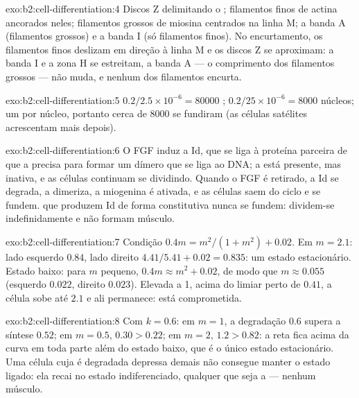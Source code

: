 \begin{solution}{exo:b2:cell-differentiation:4}
Discos Z delimitando o ; filamentos finos de actina ancorados
neles; filamentos grossos de miosina centrados na linha M; a banda A
(filamentos grossos) e a banda I (só filamentos finos). No
encurtamento, os filamentos finos deslizam em direção à linha M e os
discos Z se aproximam: a banda I e a zona H se estreitam, a banda A ---
o comprimento dos filamentos grossos --- não muda, e nenhum dos
filamentos encurta.
\end{solution}

\begin{solution}{exo:b2:cell-differentiation:5}
$0.2/2.5\times 10^{-6} = \num{80000}$ ; $0.2/25\times 10^{-6}
= \num{8000}$ núcleos; um  por núcleo, portanto cerca de
\num{8000}  se fundiram (as células satélites acrescentam
mais depois).
\end{solution}

\begin{solution}{exo:b2:cell-differentiation:6}
O FGF induz a Id, que se liga à proteína parceira de que a  precisa
para formar um dímero que se liga ao DNA; a  está presente, mas
inativa, e as células continuam se dividindo. Quando o FGF é retirado,
a Id se degrada, a  dimeriza, a miogenina é ativada, e as células
saem do ciclo e se fundem.  que produzem Id de forma
constitutiva nunca se fundem: dividem-se indefinidamente e não formam
músculo.
\end{solution}

\begin{solution}{exo:b2:cell-differentiation:7}
Condição $0.4m = m^{2}/(1 + m^{2}) + 0.02$. Em $m = 2.1$: lado esquerdo
$0.84$, lado direito $4.41/5.41 + 0.02 = 0.835$: um estado
estacionário. Estado baixo: para $m$ pequeno, $0.4m \approx m^{2} + 0.02$,
de modo que $m \approx
0.055$ (esquerdo $0.022$, direito $0.023$). Elevada a 1, acima do
limiar perto de $0.41$, a célula sobe até $2.1$ e ali permanece: está
comprometida.
\end{solution}

\begin{solution}{exo:b2:cell-differentiation:8}
Com $k = 0.6$: em $m = 1$, a degradação $0.6$ supera a síntese
$0.52$; em $m = 0.5$, $0.30 > 0.22$; em $m = 2$, $1.2 > 0.82$: a reta
fica acima da curva em toda parte além do estado baixo, que é o único
estado estacionário. Uma célula cuja  é degradada depressa demais
não consegue manter o estado ligado: ela recai no estado
indiferenciado, qualquer que seja a  --- nenhum músculo.
\end{solution}


